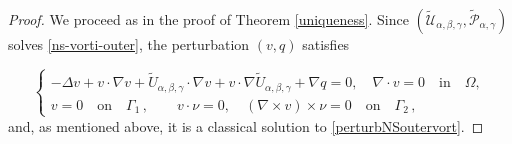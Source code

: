 \documentclass[a4paper,11pt]{amsart}
\numberwithin{equation}{section}
\numberwithin{figure}{section}
\def\U{{\mathcal U}}
\def\P{{\mathcal P}}
\begin{document}
\begin{proof}
	We proceed as in the proof of Theorem \ref{uniqueness}.
	Since $(\widetilde\U_{\alpha,\beta,\gamma},\widetilde\P_{\alpha,\gamma})$ solves \eqref{ns-vorti-outer}, the perturbation $(v,q)$ satisfies
	
	\begin{equation}\label{perturbNSoutervort}\begin{cases}
			-\Delta v + v \cdot \nabla v +\widetilde {U}_{\alpha,\beta,\gamma} \cdot \nabla v  + v \cdot \nabla \widetilde {U}_{\alpha,\beta,\gamma} + \nabla q =0, \quad \nabla\cdot v =0 \quad \text{in} \quad \Omega, \\[5pt]
			v = 0\quad \text{on}\quad \Gamma_1\, ,\qquad v\cdot \nu =0,\quad
			(\nabla\times v)\times \nu=0 \quad
			\text{on}\quad \Gamma_2\, ,
		\end{cases}
	\end{equation}and, as mentioned above, it is a classical solution to \eqref{perturbNSoutervort}.
	

\end{proof}
\end{document}

